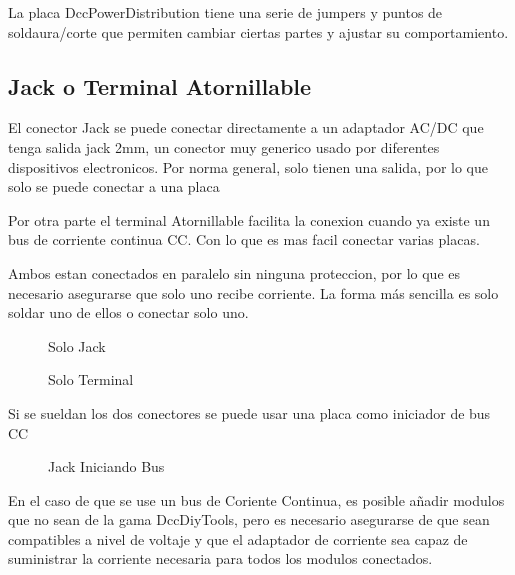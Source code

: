 
La placa DccPowerDistribution tiene una serie de jumpers y puntos de soldaura/corte
que permiten cambiar ciertas partes y ajustar su comportamiento.

\subsection{Jack o Terminal Atornillable}

El conector Jack se puede conectar directamente a un adaptador AC/DC que tenga salida 
jack 2mm, un conector muy generico usado por diferentes dispositivos electronicos.
Por norma general, solo tienen una salida, por lo que solo se puede conectar a una placa

Por otra parte el terminal Atornillable facilita la conexion cuando ya existe un bus de
corriente continua CC. Con lo que es mas facil conectar varias placas.

Ambos estan conectados en paralelo sin ninguna proteccion, por lo que es necesario
asegurarse que solo uno recibe corriente. La forma más sencilla es solo soldar uno 
de ellos o conectar solo uno.

\begin{figure}[H]
    \centering
    \begin{minipage}{0.25\textwidth}
        \centering
        
        \caption{Solo Jack}
        \label{fig:VccConnectionJack}
    \end{minipage}
    \hfill
    \begin{minipage}{0.7\textwidth}
        \centering
        
        \caption{Solo Terminal}
        \label{fig:VccConnectionTerminal}
    \end{minipage}
\end{figure}

Si se sueldan los dos conectores se puede usar una placa como iniciador de bus CC

\begin{figure}[H]
    \centering
    
    \caption{Jack Iniciando Bus}
    \label{fig:VccConnectionJackBus}
\end{figure}

En el caso de que se use un bus de Coriente Continua, es posible añadir modulos que no sean
de la gama DccDiyTools, pero es necesario asegurarse de que sean compatibles a nivel de voltaje
y que el adaptador de corriente sea capaz de suministrar la corriente necesaria para todos los
modulos conectados.

